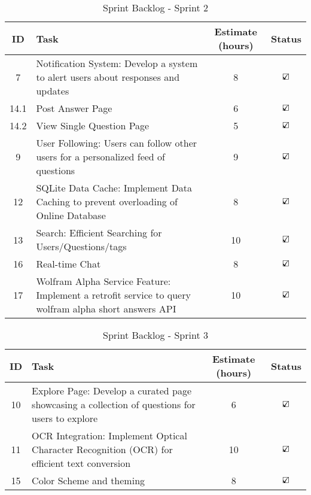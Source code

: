 \begin{table}[H]
    \centering
    \caption*{Sprint Backlog - Sprint 2}
    \begin{tabular}{|c|p{5cm}|c|c|}
        \hline
        \textbf{ID} & \textbf{Task} & \textbf{Estimate (hours)} & \textbf{Status} \\
        \hline
        7 & Notification System: Develop a system to alert users about responses and updates & 8 & $\text{\rlap{$\checkmark$}}\square$\\
        \hline
        14.1 & Post Answer Page & 6 & $\text{\rlap{$\checkmark$}}\square$\\
        \hline
        14.2 & View Single Question Page & 5 & $\text{\rlap{$\checkmark$}}\square$\\
        \hline
        9 & User Following: Users can follow other users for a personalized feed of questions & 9 & $\text{\rlap{$\checkmark$}}\square$\\
        \hline
        12 & SQLite Data Cache: Implement Data Caching to prevent overloading of Online Database & 8 & $\text{\rlap{$\checkmark$}}\square$\\
        \hline
        13 & Search: Efficient Searching for Users/Questions/tags & 10 & $\text{\rlap{$\checkmark$}}\square$\\
        \hline
        16 & Real-time Chat & 8 & $\text{\rlap{$\checkmark$}}\square$\\
        \hline
        17 & Wolfram Alpha Service Feature: Implement a retrofit service to query wolfram alpha short answers API & 10 & $\text{\rlap{$\checkmark$}}\square$\\
        \hline
    \end{tabular}
\end{table}

\begin{table}[H]
    \centering
    \caption*{Sprint Backlog - Sprint 3}
    \begin{tabular}{|c|p{5cm}|c|c|}
        \hline
        \textbf{ID} & \textbf{Task} & \textbf{Estimate (hours)} & \textbf{Status}\\
        \hline
        10 & Explore Page: Develop a curated page showcasing a collection of questions for users to explore & 6 & $\text{\rlap{$\checkmark$}}\square$\\
        \hline
        11 & OCR Integration: Implement Optical Character Recognition (OCR) for efficient text conversion & 10 & $\text{\rlap{$\checkmark$}}\square$\\
        \hline
        15 & Color Scheme and theming & 8 & $\text{\rlap{$\checkmark$}}\square$\\
        \hline
    \end{tabular}
\end{table}


